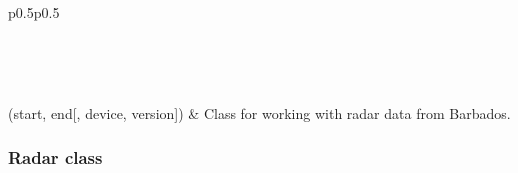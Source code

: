 \documentclass[letterpaper,10pt,english]{sphinxmanual}
\begin{document}
\begin{savenotes}\sphinxatlongtablestart\begin{longtable}{p{0.5\linewidth}p{0.5\linewidth}}
\hline

\endfirsthead

%
{}\\
\hline

\endhead

\hline
{}\\
\endfoot

\endlastfoot

{\hyperref[\detokenize{generated/MPPy.Instruments.Radar.Radar:MPPy.Instruments.Radar.Radar}]{}}(start, end{[}, device, version{]})
&
Class for working with radar data from Barbados.
\\
\hline
\end{longtable}\sphinxatlongtableend\end{savenotes}


\subsubsection{Radar class}
\label{\detokenize{generated/MPPy.Instruments.Radar.Radar:radar-class}}\label{\detokenize{generated/MPPy.Instruments.Radar.Radar::doc}}
\end{document}

